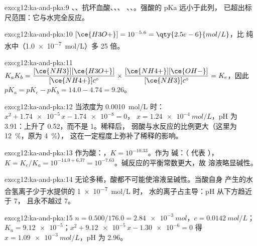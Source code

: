 \begin{solution}{exo:g12:ka-and-pka:9}
、、抗坏血酸、、、
、、。强酸的 pKa 远小于此列，
已超出标尺范围：它与水完全反应。
\end{solution}

\begin{solution}{exo:g12:ka-and-pka:10}
$[\ce{H3O+}] = 10^{-5.6} = \qty{2.5e-6}{mol/L}$，比
纯水中（\qty{1.0e-7}{mol/L}）多 25 倍。
\end{solution}

\begin{solution}{exo:g12:ka-and-pka:11}
$K_a K_b = \dfrac{[\ce{NH3}][\ce{H3O+}]}{[\ce{NH4+}]c^\circ} \times
\dfrac{[\ce{NH4+}][\ce{OH-}]}{[\ce{NH3}]c^\circ} = K_e$，因此
$pK_a = pK_e - pK_b = 14.0 - 4.74 = 9.26$。
\end{solution}

\begin{solution}{exo:g12:ka-and-pka:12}
当浓度为 \qty{0.0010}{mol/L} 时：$x^2 + \num{1.74e-5}\,x - \num{1.74e-8} = 0$，
$x = \qty{1.24e-4}{mol/L}$，pH 为 3.91：上升了 0.52，而不是 1。稀释后，
弱酸与水反应的比例更大（这里为
\qty{12}{\percent}，原为 \qty{4}{\percent}），
这在一定程度上弥补了稀释的影响。
\end{solution}

\begin{solution}{exo:g12:ka-and-pka:13}
作为酸：，$K = 10^{-10.33}$。作为
碱：（ 代表 ），$K = K_e/K_a = 10^{-14.0+6.37}
= 10^{-7.63}$。碱反应的平衡常数更大，故
溶液略显碱性。
\end{solution}

\begin{solution}{exo:g12:ka-and-pka:14}
无论多稀，酸都不可能使溶液呈碱性。当酸自身
产生的水合氢离子少于水提供的 \qty{1e-7}{mol/L} 时，
水的离子占主导：pH 从下方趋近于 7，
且永不越过 7。
\end{solution}

\begin{solution}{exo:g12:ka-and-pka:15}
$n = 0.500 / 176.0 = \qty{2.84e-3}{mol}$，$c = \qty{0.0142}{mol/L}$；
$K_a = \num{9.12e-5}$；$x^2 + \num{9.12e-5}\,x - \num{1.30e-6} = 0$ 得
$x = \qty{1.09e-3}{mol/L}$，pH 为 2.96。
\end{solution}

